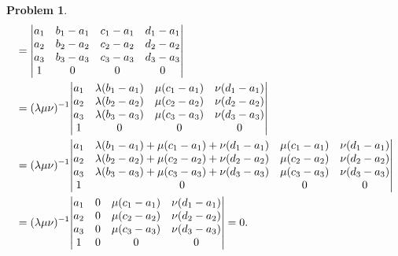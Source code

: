 \documentclass{article}
\theoremstyle{pprop}
\newtheorem{problem}{Problem}[section]
\begin{document}
\begin{problem}
\begin{align*}
& =
\mqty|a_1 & b_1-a_1 & c_1-a_1 & d_1-a_1\\a_2 & b_2-a_2 & c_2-a_2 & d_2-a_2\\a_3 & b_3-a_3 & c_3-a_3 & d_3-a_3\\ 1 & 0 & 0 & 0\\| \\
& = (\lambda\mu\nu)^{-1}
\mqty|a_1 & \lambda(b_1-a_1) & \mu(c_1-a_1) & \nu(d_1-a_1)\\a_2 & \lambda(b_2-a_2) & \mu(c_2-a_2) & \nu(d_2-a_2)\\a_3 & \lambda(b_3-a_3) & \mu(c_3-a_3) & \nu(d_3-a_3)\\ 1 & 0 & 0 & 0\\| \\
& = (\lambda\mu\nu)^{-1}
\mqty|a_1 & \lambda(b_1-a_1)+\mu(c_1-a_1)+\nu(d_1-a_1) & \mu(c_1-a_1) & \nu(d_1-a_1)\\a_2 & \lambda(b_2-a_2)+\mu(c_2-a_2)+\nu(d_2-a_2) & \mu(c_2-a_2) & \nu(d_2-a_2)\\a_3 & \lambda(b_3-a_3)+\mu(c_3-a_3)+\nu(d_3-a_3) & \mu(c_3-a_3) & \nu(d_3-a_3)\\ 1 & 0 & 0 & 0\\| \\
& = (\lambda\mu\nu)^{-1}
\mqty|a_1 & 0 & \mu(c_1-a_1) & \nu(d_1-a_1)\\a_2 & 0 & \mu(c_2-a_2) & \nu(d_2-a_2)\\a_3 & 0 & \mu(c_3-a_3) & \nu(d_3-a_3)\\ 1 & 0 & 0 & 0\\| = 0. 
\end{align*}
\end{problem}
\end{document}
